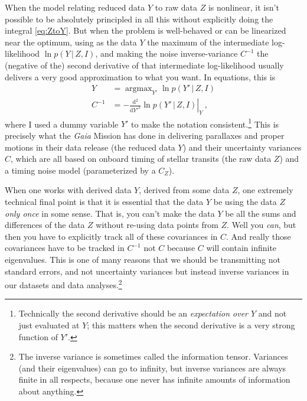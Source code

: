 \documentclass{article}
\newcommand{\dd}{\mathrm{d}}
\newcommand{\given}{\,|\,}
\DeclareMathOperator*{\argmax}{argmax}
\begin{document}
When the model relating reduced data $Y$ to raw data $Z$ is nonlinear, it isn't possible to be absolutely principled in all this without explicitly doing the integral \eqref{eq:ZtoY}.
But when the problem is well-behaved or can be linearized near the optimum, using as the data $Y$ the maximum of the intermediate log-likelihood $\ln p(Y\given Z,I)$, and making the noise inverse-variance $C^{-1}$ the (negative of the) second derivative of that intermediate log-likelihood usually delivers a very good approximation to what you want.
In equations, this is
\begin{align}
    Y &= \argmax_{Y'} \ln p(Y'\given Z, I) \\
    C^{-1} &= - \left.\frac{\dd^2}{\dd {Y'}^2} \ln p(Y'\given Z, I)\right|_Y ~,
\end{align}
where I used a dummy variable $Y'$ to make the notation consistent.\footnote{Technically the second derivative should be an \emph{expectation over $Y$} and not just evaluated at $Y$; this matters when the second derivative is a very strong function of $Y'$.}
This is precisely what the \textsl{Gaia} Mission \cite{gaia} has done in delivering parallaxes and proper motions in their data release \cite{gaiadr3} (the reduced data $Y$) and their uncertainty variances $C$, which are all based on onboard timing of stellar transits (the raw data $Z$) and a timing noise model (parameterized by a $C_Z$).

When one works with derived data $Y$, derived from some data $Z$, one extremely technical final point is that it is essential that the data $Y$ be using the data $Z$ \emph{only once} in some sense.
That is, you can't make the data $Y$ be all the sums and differences of the data $Z$ without re-using data points from $Z$.
Well you \emph{can}, but then you have to explicitly track all of these covariances in $C$.
And really those covariances have to be tracked in $C^{-1}$ not $C$ because $C$ will contain infinite eigenvalues.
This is one of many reasons that we should be transmitting not standard errors, and not uncertainty variances but instead inverse variances in our datasets and data analyses.\footnote{The inverse variance is sometimes called the information tensor. Variances (and their eigenvalues) can go to infinity, but inverse variances are always finite in all respects, because one never has infinite amounts of information about anything.}
\end{document}
